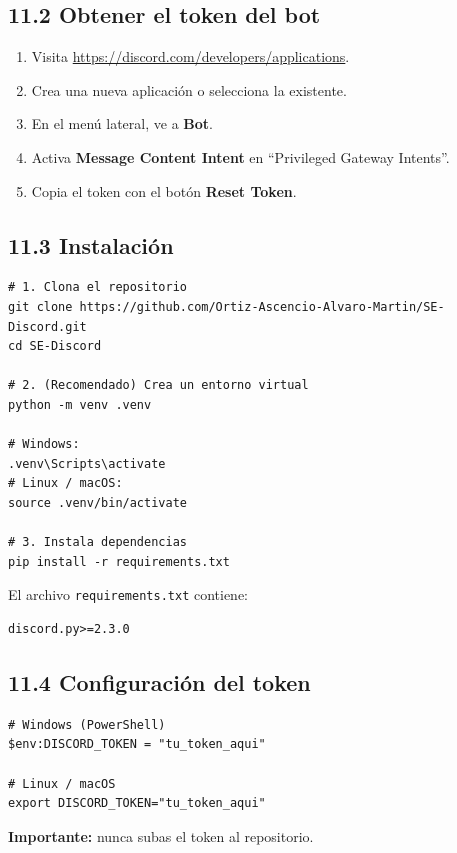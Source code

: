 \documentclass[12pt,spanish]{article}
\begin{document}
\subsection*{11.2 Obtener el token del bot}

\begin{enumerate}
  \item Visita \url{https://discord.com/developers/applications}.
  \item Crea una nueva aplicación o selecciona la existente.
  \item En el menú lateral, ve a \textbf{Bot}.
  \item Activa \textbf{Message Content Intent} en ``Privileged Gateway Intents''.
  \item Copia el token con el botón \textbf{Reset Token}.
\end{enumerate}

\subsection*{11.3 Instalación}

\begin{lstlisting}[style=python, language={}]
# 1. Clona el repositorio
git clone https://github.com/Ortiz-Ascencio-Alvaro-Martin/SE-Discord.git
cd SE-Discord

# 2. (Recomendado) Crea un entorno virtual
python -m venv .venv

# Windows:
.venv\Scripts\activate
# Linux / macOS:
source .venv/bin/activate

# 3. Instala dependencias
pip install -r requirements.txt
\end{lstlisting}

El archivo \texttt{requirements.txt} contiene:
\begin{lstlisting}[style=python, language={}]
discord.py>=2.3.0
\end{lstlisting}

\subsection*{11.4 Configuración del token}

\begin{lstlisting}[style=python, language={}]
# Windows (PowerShell)
$env:DISCORD_TOKEN = "tu_token_aqui"

# Linux / macOS
export DISCORD_TOKEN="tu_token_aqui"
\end{lstlisting}

\textbf{Importante:} nunca subas el token al repositorio.
\end{document}
